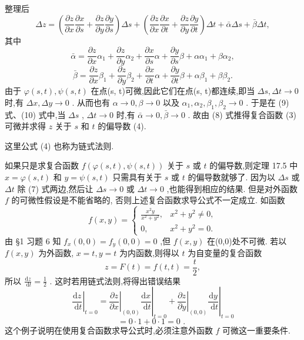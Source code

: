 整理后
\[
{\Delta z} = \left( {\frac{\partial z}{\partial x}\frac{\partial x}{\partial s} + \frac{\partial z}{\partial y}\frac{\partial y}{\partial s}}\right) {\Delta s} + \left( {\frac{\partial z}{\partial x}\frac{\partial x}{\partial t} + \frac{\partial z}{\partial y}\frac{\partial y}{\partial t}}\right) {\Delta t} + \bar{\alpha }{\Delta s} + \bar{\beta }{\Delta t}, \tag{8}
\]
其中
\[
\bar{\alpha } = \frac{\partial z}{\partial x}{\alpha }_{1} + \frac{\partial z}{\partial y}{\alpha }_{2} + \frac{\partial x}{\partial s}\alpha  + \frac{\partial y}{\partial s}\beta  + \alpha {\alpha }_{1} + \beta {\alpha }_{2}, \tag{9}
\]
\[
\bar{\beta } = \frac{\partial z}{\partial x}{\beta }_{1} + \frac{\partial z}{\partial y}{\beta }_{2} + \frac{\partial x}{\partial t}\alpha  + \frac{\partial y}{\partial t}\beta  + \alpha {\beta }_{1} + \beta {\beta }_{2}. \tag{10}
\]
由于 \(\varphi \left( {s,t}\right) ,\psi \left( {s,t}\right)\) 在点(s, t)可微,因此它们在点(s, t)都连续,即当 \({\Delta s},{\Delta t} \rightarrow  0\) 时,有 \({\Delta x},{\Delta y} \rightarrow  0\) . 从而也有 \(\alpha  \rightarrow  0,\beta  \rightarrow  0\) 以及 \({\alpha }_{1},{\alpha }_{2},{\beta }_{1},{\beta }_{2} \rightarrow  0\) . 于是在 (9) 式、(10) 式中,当 \({\Delta s}\) , \({\Delta t} \rightarrow  0\) 时,有 \(\bar{\alpha } \rightarrow  0,\bar{\beta } \rightarrow  0\) . 故由 (8) 式推得复合函数 (3) 可微并求得 \(z\) 关于 \(s\) 和 \(t\) 的偏导数 (4).

这里公式 (4) 也称为链式法则.

\begin{remark}

\end{remark}
如果只是求复合函数 \(f\left( {\varphi \left( {s,t}\right) ,\psi \left( {s,t}\right) }\right)\) 关于 \(s\) 或 \(t\) 的偏导数,则定理 17.5 中 \(x = \varphi \left( {s,t}\right)\) 和 \(y = \psi \left( {s,t}\right)\) 只需具有关于 \(s\) 或 \(t\) 的偏导数就够了. 因为以 \({\Delta s}\) 或 \({\Delta t}\) 除 (7) 式两边,然后让 \({\Delta s} \rightarrow  0\) 或 \({\Delta t} \rightarrow  0\) ,也能得到相应的结果. 但是对外函数 \(f\) 的可微性假设是不能省略的, 否则上述复合函数求导公式不一定成立. 如函数
\[
f\left( {x,y}\right)  = \left\{  \begin{matrix} \frac{{x}^{2}y}{{x}^{2} + {y}^{2}}, & {x}^{2} + {y}^{2} \neq  0, \\  0, & {x}^{2} + {y}^{2} = 0. \end{matrix}\right.
\]
由 §1 习题 6 知 \({f}_{x}\left( {0,0}\right)  = {f}_{y}\left( {0,0}\right)  = 0\) ,但 \(f\left( {x,y}\right)\) 在(0,0)处不可微. 若以 \(f\left( {x,y}\right)\) 为外函数, \(x = t,y = t\) 为内函数,则得以 \(t\) 为自变量的复合函数
\[
z = F\left( t\right)  = f\left( {t,t}\right)  = \frac{t}{2},
\]
所以 \(\frac{\mathrm{d}z}{\mathrm{\;d}t} = \frac{1}{2}\) . 这时若用链式法则,将得出错误结果
\[
{\left. \frac{\mathrm{d}z}{\mathrm{\;d}t}\right| }_{t = 0} = {\left. {\left. \frac{\partial z}{\partial x}\right| }_{\left( 0,0\right) }\frac{\mathrm{d}x}{\mathrm{\;d}t}\right| }_{t = 0} + {\left. {\left. \frac{\partial z}{\partial y}\right| }_{\left( 0,0\right) }\frac{\mathrm{d}y}{\mathrm{\;d}t}\right| }_{t = 0}
\]
\[
= 0 \cdot  1 + 0 \cdot  1 = 0\text{ . }
\]
这个例子说明在使用复合函数求导公式时,必须注意外函数 \(f\) 可微这一重要条件.

